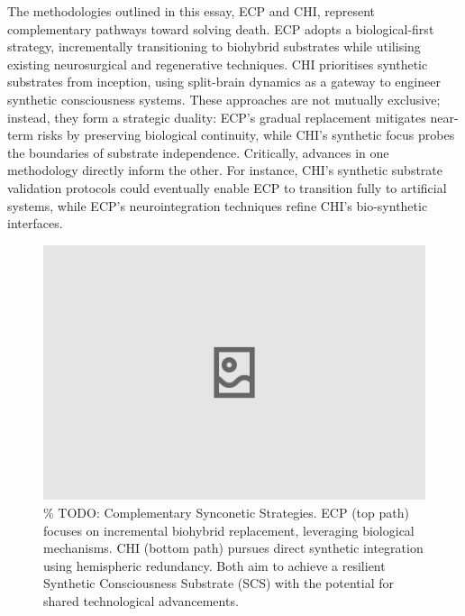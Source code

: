 \documentclass[10pt]{article}
\begin{document}
\begin{sloppypar}
  The methodologies outlined in this essay, ECP and CHI, represent complementary pathways toward solving death. ECP adopts a biological-first strategy, incrementally transitioning to biohybrid substrates while utilising existing neurosurgical and regenerative techniques. CHI prioritises synthetic substrates from inception, using split-brain dynamics as a gateway to engineer synthetic consciousness systems. These approaches are not mutually exclusive; instead, they form a strategic duality: ECP’s gradual replacement mitigates near-term risks by preserving biological continuity, while CHI’s synthetic focus probes the boundaries of substrate independence. Critically, advances in one methodology directly inform the other. For instance, CHI’s synthetic substrate validation protocols could eventually enable ECP to transition fully to artificial systems, while ECP’s neurointegration techniques refine CHI’s bio-synthetic interfaces.

  \begin{figure}[ht!]
    \centering
    \includegraphics[width=\textwidth]{figures/complementary-pathways.png}
    \caption{\% TODO: Complementary Synconetic Strategies. ECP (top path) focuses on incremental biohybrid replacement, leveraging biological mechanisms. CHI (bottom path) pursues direct synthetic integration using hemispheric redundancy. Both aim to achieve a resilient Synthetic Consciousness Substrate (SCS) with the potential for shared technological advancements.}
    \label{fig:complementary-pathways}
  \end{figure}


\end{sloppypar}
\end{document}
